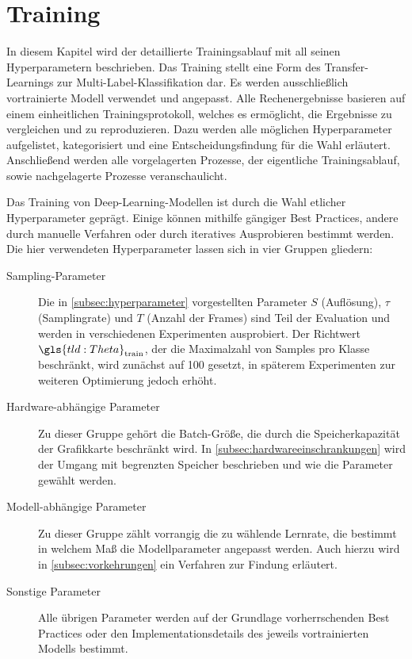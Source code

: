 \chapter{Training}
\label{ch:training}

In diesem Kapitel wird der detaillierte Trainingsablauf mit all seinen Hyperparametern beschrieben.
Das Training stellt eine Form des Transfer-Learnings zur Multi-Label-Klassifikation dar.
Es werden ausschließlich vortrainierte Modell verwendet und angepasst.
Alle Rechenergebnisse basieren auf einem einheitlichen Trainingsprotokoll, welches es ermöglicht, die Ergebnisse zu vergleichen und zu reproduzieren.
Dazu werden alle möglichen Hyperparameter aufgelistet, kategorisiert und eine Entscheidungsfindung für die Wahl erläutert.
Anschließend werden alle vorgelagerten Prozesse, der eigentliche Trainingsablauf, sowie nachgelagerte Prozesse veranschaulicht.

Das Training von Deep-Learning-Modellen ist durch die Wahl etlicher Hyperparameter geprägt.
Einige können mithilfe gängiger Best Practices, andere durch manuelle Verfahren oder durch iteratives Ausprobieren bestimmt werden.
Die hier verwendeten Hyperparameter lassen sich in vier Gruppen gliedern:

\begin{description}
    \item[Sampling-Parameter] Die in \autoref{subsec:hyperparameter} vorgestellten Parameter $S$ (Auflösung), $\tau$ (Samplingrate) und $T$ (Anzahl der Frames) sind Teil der Evaluation und werden in verschiedenen Experimenten ausprobiert.
    Der Richtwert $\gls{tld:Theta}_\text{train}$, der die Maximalzahl von Samples pro Klasse beschränkt, wird zunächst auf 100 gesetzt, in späterem Experimenten zur weiteren Optimierung jedoch erhöht.
    \item[Hardware-abhängige Parameter]
    Zu dieser Gruppe gehört \zB die Batch-Größe, die durch die Speicherkapazität der Grafikkarte beschränkt wird.
    In \autoref{subsec:hardwareeinschrankungen} wird der Umgang mit begrenzten Speicher beschrieben und wie die Parameter gewählt werden.
    \item[Modell-abhängige Parameter] Zu dieser Gruppe zählt vorrangig die zu wählende Lernrate, die bestimmt in welchem Maß die Modellparameter angepasst werden.
    Auch hierzu wird in \autoref{subsec:vorkehrungen} ein Verfahren zur Findung erläutert.
    \item[Sonstige Parameter] Alle übrigen Parameter werden auf der Grundlage vorherrschenden Best Practices oder den Implementationsdetails des jeweils vortrainierten Modells bestimmt.
\end{description}

